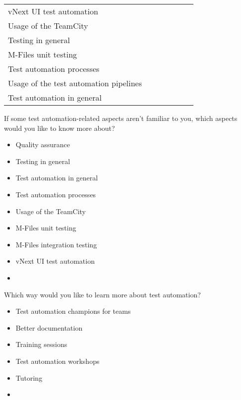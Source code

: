 \begin{question}[resume]
\begin{center}
\begin{tabularx}{\textwidth}{X c c c c c c}
			vNext UI test automation & \radiobutton & \radiobutton & \radiobutton & \radiobutton & \radiobutton & \radiobutton\\
			Usage of the TeamCity & \radiobutton & \radiobutton & \radiobutton & \radiobutton & \radiobutton & \radiobutton\\
			Testing in general & \radiobutton & \radiobutton & \radiobutton & \radiobutton & \radiobutton & \radiobutton\\
			M-Files unit testing & \radiobutton & \radiobutton & \radiobutton & \radiobutton & \radiobutton & \radiobutton\\
			Test automation processes & \radiobutton & \radiobutton & \radiobutton & \radiobutton & \radiobutton & \radiobutton\\
			Usage of the test automation pipelines & \radiobutton & \radiobutton & \radiobutton & \radiobutton & \radiobutton & \radiobutton\\
			Test automation in general & \radiobutton & \radiobutton & \radiobutton & \radiobutton & \radiobutton & \radiobutton\\
		\end{tabularx}
	\end{center}
	\item If some test automation-related aspects aren't familiar to you, which aspects would you like to know more about?\redcross
	\begin{itemize}[noitemsep, leftmargin=1.5em]
		\renewcommand\labelitemi{$\square$}
		\item Quality assurance
		\item Testing in general
		\item Test automation in general
		\item Test automation processes
		\item Usage of the TeamCity
		\item M-Files unit testing
		\item M-Files integration testing
		\item vNext UI test automation
		\item \othertextfield
	\end{itemize}
	\item Which way would you like to learn more about test automation?\greencheckmark\label{survey_question:preferred_ways_of_learning}
	\begin{itemize}[noitemsep, leftmargin=1.5em]
		\renewcommand\labelitemi{$\square$}
		\item Test automation champions for teams
		\item Better documentation
		\item Training sessions
		\item Test automation workshops
		\item Tutoring
		\item \othertextfield
	\end{itemize}
\end{question}

